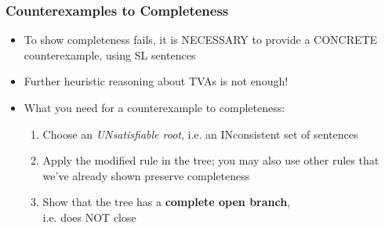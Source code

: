\iffalse %
\begin{frame}
\frametitle{Why `bottom-up' reasoning works for Completeness}

\begin{itemize}[<+->]

\item Given an open branch, we ask whether applying the rule preserves the existence of an open branch

\item Semantically: given a satisfiable set of sentences, we ask whether the rule preserves the existence of a satisfiable set

\item Sound rules take us from trees with open branches to trees with open branches

\end{itemize}
\end{frame}

\fi 



\begin{frame}
\frametitle{Counterexamples to Completeness}

\begin{itemize}[<+->]

\item To show completeness fails, it is NECESSARY to provide a CONCRETE counterexample, using SL sentences

\bi

\item Further heuristic reasoning about TVAs is not enough!

\ei

\bigskip

\item What you need for a counterexample to completeness:

\begin{enumerate}[1.)]

\item Choose an \emph{UNsatisfiable root}, i.e. an INconsistent set of sentences

\item Apply the modified rule in the tree; you may also use other rules that we've already shown preserve completeness

\item Show that the tree has a \textbf{\textcolor{OGlyallpink}{complete open branch}}, \\ i.e. does NOT close

\end{enumerate}

\end{itemize}
\end{frame}




